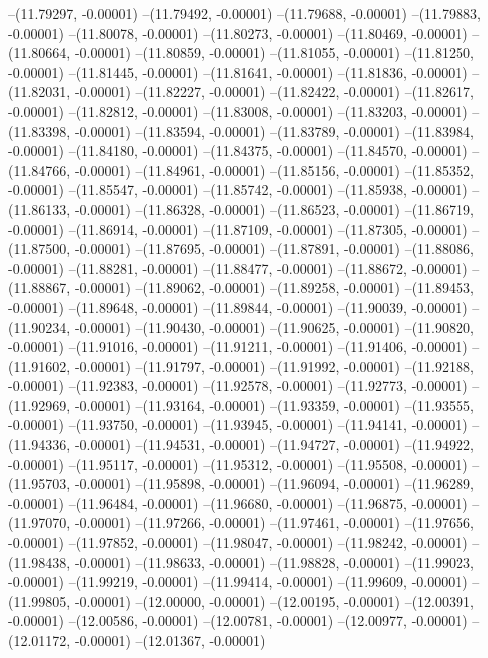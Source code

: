 --(11.79297, -0.00001)
--(11.79492, -0.00001)
--(11.79688, -0.00001)
--(11.79883, -0.00001)
--(11.80078, -0.00001)
--(11.80273, -0.00001)
--(11.80469, -0.00001)
--(11.80664, -0.00001)
--(11.80859, -0.00001)
--(11.81055, -0.00001)
--(11.81250, -0.00001)
--(11.81445, -0.00001)
--(11.81641, -0.00001)
--(11.81836, -0.00001)
--(11.82031, -0.00001)
--(11.82227, -0.00001)
--(11.82422, -0.00001)
--(11.82617, -0.00001)
--(11.82812, -0.00001)
--(11.83008, -0.00001)
--(11.83203, -0.00001)
--(11.83398, -0.00001)
--(11.83594, -0.00001)
--(11.83789, -0.00001)
--(11.83984, -0.00001)
--(11.84180, -0.00001)
--(11.84375, -0.00001)
--(11.84570, -0.00001)
--(11.84766, -0.00001)
--(11.84961, -0.00001)
--(11.85156, -0.00001)
--(11.85352, -0.00001)
--(11.85547, -0.00001)
--(11.85742, -0.00001)
--(11.85938, -0.00001)
--(11.86133, -0.00001)
--(11.86328, -0.00001)
--(11.86523, -0.00001)
--(11.86719, -0.00001)
--(11.86914, -0.00001)
--(11.87109, -0.00001)
--(11.87305, -0.00001)
--(11.87500, -0.00001)
--(11.87695, -0.00001)
--(11.87891, -0.00001)
--(11.88086, -0.00001)
--(11.88281, -0.00001)
--(11.88477, -0.00001)
--(11.88672, -0.00001)
--(11.88867, -0.00001)
--(11.89062, -0.00001)
--(11.89258, -0.00001)
--(11.89453, -0.00001)
--(11.89648, -0.00001)
--(11.89844, -0.00001)
--(11.90039, -0.00001)
--(11.90234, -0.00001)
--(11.90430, -0.00001)
--(11.90625, -0.00001)
--(11.90820, -0.00001)
--(11.91016, -0.00001)
--(11.91211, -0.00001)
--(11.91406, -0.00001)
--(11.91602, -0.00001)
--(11.91797, -0.00001)
--(11.91992, -0.00001)
--(11.92188, -0.00001)
--(11.92383, -0.00001)
--(11.92578, -0.00001)
--(11.92773, -0.00001)
--(11.92969, -0.00001)
--(11.93164, -0.00001)
--(11.93359, -0.00001)
--(11.93555, -0.00001)
--(11.93750, -0.00001)
--(11.93945, -0.00001)
--(11.94141, -0.00001)
--(11.94336, -0.00001)
--(11.94531, -0.00001)
--(11.94727, -0.00001)
--(11.94922, -0.00001)
--(11.95117, -0.00001)
--(11.95312, -0.00001)
--(11.95508, -0.00001)
--(11.95703, -0.00001)
--(11.95898, -0.00001)
--(11.96094, -0.00001)
--(11.96289, -0.00001)
--(11.96484, -0.00001)
--(11.96680, -0.00001)
--(11.96875, -0.00001)
--(11.97070, -0.00001)
--(11.97266, -0.00001)
--(11.97461, -0.00001)
--(11.97656, -0.00001)
--(11.97852, -0.00001)
--(11.98047, -0.00001)
--(11.98242, -0.00001)
--(11.98438, -0.00001)
--(11.98633, -0.00001)
--(11.98828, -0.00001)
--(11.99023, -0.00001)
--(11.99219, -0.00001)
--(11.99414, -0.00001)
--(11.99609, -0.00001)
--(11.99805, -0.00001)
--(12.00000, -0.00001)
--(12.00195, -0.00001)
--(12.00391, -0.00001)
--(12.00586, -0.00001)
--(12.00781, -0.00001)
--(12.00977, -0.00001)
--(12.01172, -0.00001)
--(12.01367, -0.00001)
